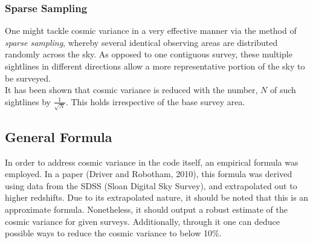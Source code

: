 \documentclass [a4paper, 12pt] {article}
\begin{document}
\subsubsection {Sparse Sampling}
One might tackle cosmic variance in a very effective manner via the method of \emph{sparse sampling}, whereby several identical observing areas are distributed randomly across the sky. As opposed to one contiguous survey, these multiple sightlines in different directions allow a more representative portion of the sky to be surveyed. 
\\
\newline
It has been shown that cosmic variance is reduced with the number, $N$ of such sightlines by $\frac{1}{\sqrt{N}}$. This holds irrespective of the base survey area\cite{Driver01102010}.

\subsection {General Formula}

In order to address cosmic variance in the code itself, an empirical formula was employed. In a paper (Driver and Robotham, 2010), this formula was derived using data from the SDSS (Sloan Digital Sky Survey), and extrapolated out to higher redshifts\cite{Driver01102010}. Due to its extrapolated nature, it should be noted that this is an approximate formula. Nonetheless, it should output a robust estimate of the cosmic variance for given surveys. Additionally, through it one can deduce possible ways to reduce the cosmic variance to below 10\%.
\end{document}
